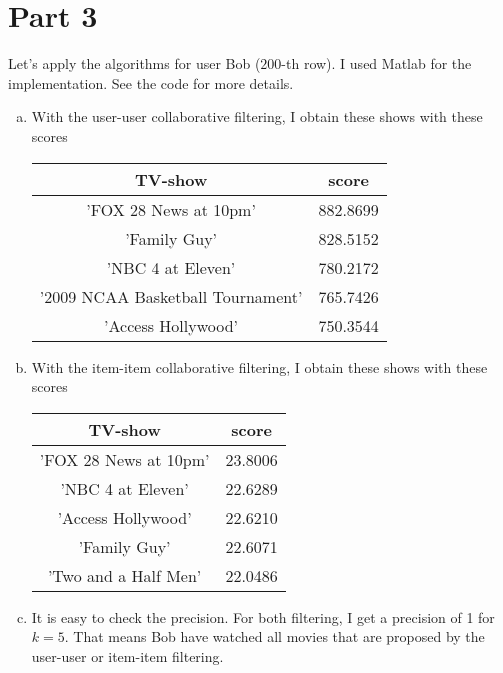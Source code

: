 \documentclass[11pt,a4paper,notitlepage]{article}
\begin{document}
\section*{Part 3}
Let's apply the algorithms for user Bob ($200$-th row). I used Matlab for the implementation. See the code for more details.
\begin{enumerate}[(a)]
\item With the user-user collaborative filtering, I obtain these shows with these scores\\

\begin{tabular}{c c}
TV-show & score\\
\hline
    'FOX 28 News at 10pm' & 882.8699\\ 
    'Family Guy' & 828.5152\\
    'NBC 4 at Eleven' & 780.2172\\
    '2009 NCAA Basketball Tournament'& 765.7426\\
    'Access Hollywood'& 750.3544\\
\end{tabular}

\item With the item-item collaborative filtering, I obtain these shows with these scores\\

\begin{tabular}{c c}
TV-show & score\\
\hline
    'FOX 28 News at 10pm' & 23.8006\\    
    'NBC 4 at Eleven' & 22.6289\\
    'Access Hollywood'& 22.6210 \\
    'Family Guy'& 22.6071    \\
    'Two and a Half Men'& 22.0486
\end{tabular}

\item It is easy to check the precision. For both filtering, I get a precision of 1 for $k=5$. That means Bob have watched all movies that are proposed by the user-user or item-item filtering.
\end{enumerate}
\end{document}
